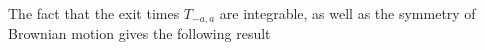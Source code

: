 
The fact that the exit times $T_{-a,a}$ are integrable, as well as the symmetry of Brownian motion gives the following result

